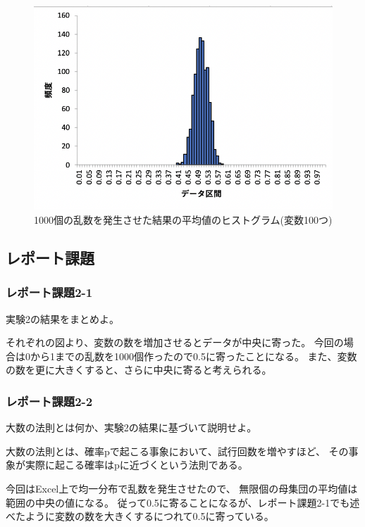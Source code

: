 \documentclass[12pt]{jarticle}
\begin{document}
\begin{figure}[h]
    \begin{center}
        \includegraphics[scale=0.8]{kadai4_2graph5.png}
    \end{center}
    \caption{1000個の乱数を発生させた結果の平均値のヒストグラム(変数100つ)}
\end{figure}

\clearpage

\subsection{レポート課題}
\subsubsection*{レポート課題2-1}
\begin{shadebox}
    実験2の結果をまとめよ。
\end{shadebox}
それぞれの図より、変数の数を増加させるとデータが中央に寄った。
今回の場合は0から1までの乱数を1000個作ったので0.5に寄ったことになる。
また、変数の数を更に大きくすると、さらに中央に寄ると考えられる。

\subsubsection*{レポート課題2-2}
\begin{shadebox}
    大数の法則とは何か、実験2の結果に基づいて説明せよ。
\end{shadebox}
大数の法則とは、確率pで起こる事象において、試行回数を増やすほど、
その事象が実際に起こる確率はpに近づくという法則である。

今回はExcel上で均一分布で乱数を発生させたので、
無限個の母集団の平均値は範囲の中央の値になる。
従って0.5に寄ることになるが、レポート課題2-1でも述べたように変数の数を大きくするにつれて0.5に寄っている。
\end{document}
